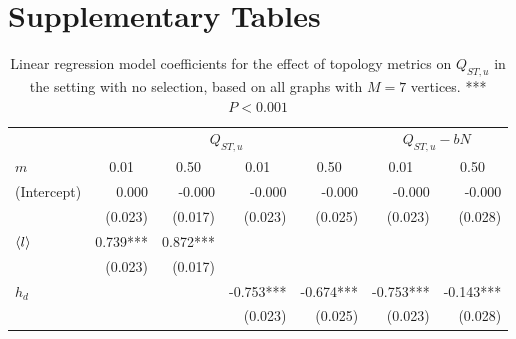 \section{Supplementary Tables}
\FloatBarrier

\begin{table}  
  \caption{Linear regression model coefficients for the effect of topology metrics on $Q_{ST,u}$ in the setting with no selection, based on all graphs with $M=7$ vertices. *** $P < 0.001$}
  \vspace{3mm}
  \centering
    \begin{tabular}{lrrrrrr}
    \toprule
                &  \multicolumn{4}{c}{$Q_{ST,u}$}                                                                          &      \multicolumn{2}{c}{$Q_{ST,u} - b N$}          \\ 
                      \cmidrule(lr){2-5}                                                                                           \cmidrule(lr){6-7}
    $m$         & \multicolumn{1}{c}{0.01} & \multicolumn{1}{c}{0.50} & \multicolumn{1}{c}{0.01} & \multicolumn{1}{c}{0.50} & \multicolumn{1}{c}{0.01} & \multicolumn{1}{c}{0.50} \\ 
    \hline
(Intercept)    &                    0.000 &                   -0.000 &                   -0.000 &                   -0.000 &                   -0.000 &                   -0.000 \\
               &                  (0.023) &                  (0.017) &                  (0.023) &                  (0.025) &                  (0.023) &                  (0.028) \\
$\langle l \rangle$           &                 0.739*** &                 0.872*** &                          &                          &                          &                          \\
               &                  (0.023) &                  (0.017) &                          &                          &                          &                          \\
$h_d$          &                          &                          &                -0.753*** &                -0.674*** &                -0.753*** &                -0.143*** \\
               &                          &                          &                  (0.023) &                  (0.025) &                  (0.023) &                  (0.028) \\

\end{tabular}
\end{table}
